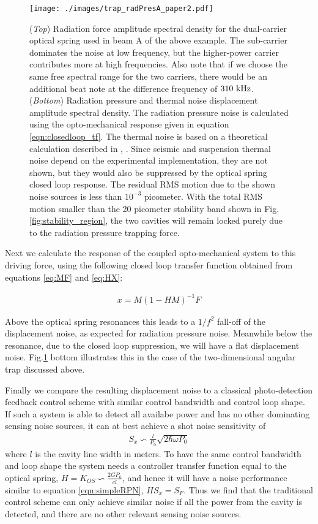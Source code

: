 \documentclass[%
 reprint,
 amsmath,amssymb,
 aps,
]{revtex4-1}
\begin{document}
\begin{figure}[htbp]
	\centering
		\texttt{[image: ./images/trap\_radPresA\_paper2.pdf]}
	\caption{(\emph{Top}) Radiation force amplitude spectral density for the dual-carrier optical spring used in beam A of the above example. The sub-carrier dominates the noise at low frequency, but the higher-power carrier contributes more at high frequencies. Also note that if we choose the same free spectral range for the two carriers, there would be an additional beat note at the difference frequency of $310~{\rm kHz}$. (\emph{Bottom})  Radiation pressure and thermal noise displacement amplitude spectral density. The radiation pressure noise is calculated using the opto-mechanical response given in equation \ref{eqn:closedloop_tf}. The thermal noise is based on a theoretical calculation described in \cite{Saulson90}, \cite{Ballmer13}. Since seismic and suspension thermal noise depend on the experimental implementation, they are not shown, but they would also be suppressed by the optical spring closed loop response. The residual RMS motion due to the shown noise sources is less than $10^{-3}$ picometer. With the total RMS motion smaller than the 20 picometer stability band shown in Fig.\ref{fig:stability_region}, the two cavities will remain locked purely due to the radiation pressure trapping force.}
	\label{fig:RFASD}
\end{figure}

Next we calculate the response of the coupled opto-mechanical system to this driving force, using the following closed loop transfer function obtained from equations \ref{eq:MF} and \ref{eq:HX}:

\begin{eqnarray}
\label{eqn:closedloop_tf}
x = {M}({1-HM})^{-1}F
\end{eqnarray}

Above the optical spring resonances this leads to a $1/f^2$ fall-off of the displacement noise, as expected for radiation pressure noise. Meanwhile below the resonance, due to the closed loop suppression, we will have a flat displacement noise. %
Fig.\ref{fig:RFASD} bottom illustrates this in the case of the two-dimensional angular trap discussed above.

Finally we compare the resulting displacement noise to a classical photo-detection feedback control scheme with similar control bandwidth and control loop shape. If such a system is able to detect all availabe power and has no other dominating sensing noise sources, it can at best achieve a shot noise sensitivity of 
\begin{eqnarray}
\label{eqn:classyShot}
S_x \backsim \frac{l}{P_0}\sqrt{2 \hbar \omega P_0}
\end{eqnarray}
where $l$ is the cavity line width in meters. To have the same control bandwidth and loop shape the system needs a controller transfer function equal to the optical spring, $H = K_{OS} \backsim \frac{2 G P_0}{c l}$, and hence it will have a  noise performance similar to equation \ref{eqn:simpleRPN},  $H S_x=S_F$.  
Thus we find that the traditional control scheme can only achieve similar noise if all the power from the cavity is detected, and there are no other relevant sensing noise sources. 
\end{document}
